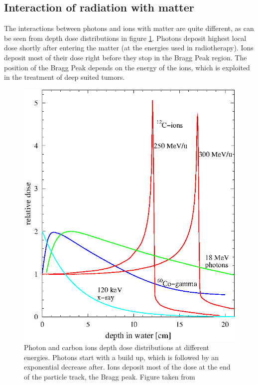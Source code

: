 \documentclass[type=dr, dr=rernat, accentcolor=tud7b,colorbacktitle, bigchapter, openright, twoside, 12pt ]{tudthesis}
\begin{document}
\subsection{Interaction of radiation with matter}

The interactions between photons and ions with matter are quite different, as can be seen from depth dose distributions in figure \ref{ddp}.  Photons deposit highest local dose shortly after entering the matter 
(at the energies used in radiotherapy). Ions deposit most of their dose right before they stop in the Bragg Peak region. The position of the Bragg Peak depends on the energy of the ions, which is exploited in the treatment
of deep suited tumors.

\newpage
 
\vspace*{1cm}
 
\begin{figure}[H]
\begin{center}
\includegraphics[scale=1]{./Images/depthdose.png}
\caption{Photon and carbon ions depth dose distributions at different energies. Photons start with a build up, which is followed by an exponential decrease after.
Ions deposit most of the dose at the end of the particle track, the Bragg peak. Figure taken from \cite{Schardt2010} }
\label{ddp}
\end{center}
\end{figure}
\end{document}
